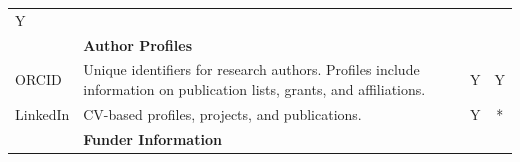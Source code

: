 \documentclass[]{krantz}
\begin{document}
\begin{longtable}[]{@{}llcc@{}}
\begin{minipage}[t]{0.02\columnwidth}
Y\strut
\end{minipage}\tabularnewline
\begin{minipage}[t]{0.10\columnwidth}\raggedright\strut
\strut
\end{minipage} & \begin{minipage}[t]{0.74\columnwidth}\raggedright\strut
\textbf{Author Profiles}\strut
\end{minipage} & \begin{minipage}[t]{0.02\columnwidth}\centering\strut
\strut
\end{minipage} & \begin{minipage}[t]{0.02\columnwidth}\centering\strut
\strut
\end{minipage}\tabularnewline
\begin{minipage}[t]{0.10\columnwidth}\raggedright\strut
ORCID\strut
\end{minipage} & \begin{minipage}[t]{0.74\columnwidth}\raggedright\strut
Unique identifiers for research authors. Profiles include information on
publication lists, grants, and affiliations.\strut
\end{minipage} & \begin{minipage}[t]{0.02\columnwidth}\centering\strut
Y\strut
\end{minipage} & \begin{minipage}[t]{0.02\columnwidth}\centering\strut
Y\strut
\end{minipage}\tabularnewline
\begin{minipage}[t]{0.10\columnwidth}\raggedright\strut
LinkedIn\strut
\end{minipage} & \begin{minipage}[t]{0.74\columnwidth}\raggedright\strut
CV-based profiles, projects, and publications.\strut
\end{minipage} & \begin{minipage}[t]{0.02\columnwidth}\centering\strut
Y\strut
\end{minipage} & \begin{minipage}[t]{0.02\columnwidth}\centering\strut
*\strut
\end{minipage}\tabularnewline
\begin{minipage}[t]{0.10\columnwidth}\raggedright\strut
\strut
\end{minipage} & \begin{minipage}[t]{0.74\columnwidth}\raggedright\strut
\textbf{Funder Information}\strut
\end{minipage} & \begin{minipage}[t]{0.02\columnwidth}\centering\strut

\end{minipage}
\end{longtable}
\end{document}
